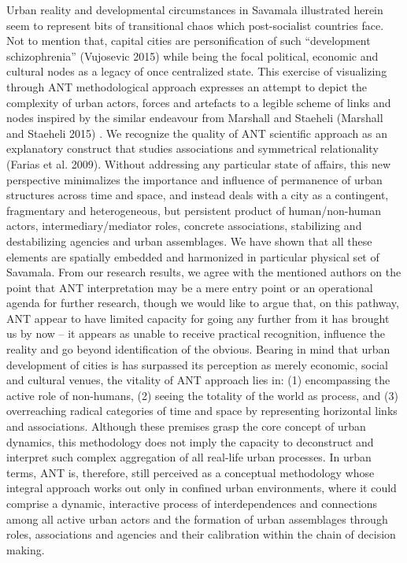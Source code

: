 \documentclass[11pt]{report}
\begin{document}
Urban reality and developmental circumstances in Savamala illustrated herein seem to represent bits of transitional chaos which post-socialist countries face. Not to mention that, capital cities are personification of such “development schizophrenia” (Vujosevic 2015) while being the focal political, economic and cultural nodes as a legacy of once centralized state. This exercise of visualizing through ANT methodological approach expresses an attempt to depict the complexity of urban actors, forces and artefacts to a legible scheme of links and nodes inspired by the similar endeavour from Marshall and Staeheli (Marshall and Staeheli 2015) . We recognize the quality of ANT scientific approach as an explanatory construct that studies associations and symmetrical relationality (Farias et al. 2009). Without addressing any particular state of affairs, this new perspective minimalizes the importance and influence of permanence of urban structures across time and space, and instead deals with a city as a contingent, fragmentary and heterogeneous, but persistent product of human/non-human actors, intermediary/mediator roles, concrete associations, stabilizing and destabilizing agencies and urban assemblages. We have shown that all these elements are spatially embedded and harmonized in particular physical set of Savamala. From our research results, we agree with the mentioned authors on the point that ANT interpretation may be a mere entry point or an operational agenda for further research, though we would like to argue that, on this pathway, ANT appear to have limited capacity for going any further from it has brought us by now – it appears as unable to receive practical recognition, influence the reality and go beyond identification of the obvious.
Bearing in mind that urban development of cities is has surpassed its perception as merely economic, social and cultural venues, the vitality of ANT approach lies in: (1) encompassing the active role of non-humans, (2) seeing the totality of the world as process, and (3) overreaching radical categories of time and space by representing horizontal links and associations. Although these premises grasp the core concept of urban dynamics, this methodology does not imply the capacity to deconstruct and interpret such complex aggregation of all real-life urban processes. In urban terms, ANT is, therefore, still perceived as a conceptual methodology whose integral approach works out only in confined urban environments, where it could comprise a dynamic, interactive process of interdependences and connections among all active urban actors and the formation of urban assemblages through roles, associations and agencies and their calibration within the chain of decision making.
\end{document}
